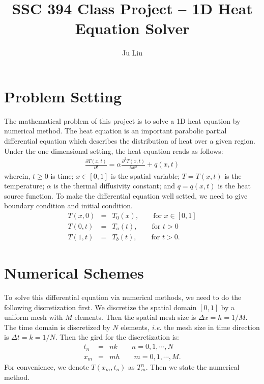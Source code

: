\documentclass[a4paper,12pt]{article}
\title{\textbf{SSC 394 Class Project -- 1D Heat Equation Solver}}
\author{Ju Liu}
\begin{document}
\maketitle
\section{Problem Setting}
The mathematical problem of this project is to solve a 1D heat equation by numerical method. The heat equation is an important parabolic partial differential equation which describes the distribution of heat over a given region. Under the one dimensional setting, the heat equation reads as follows:
\begin{eqnarray}
\frac{\partial T(x,t)}{\partial t} = \alpha \frac{\partial^{2}T(x,t)}{\partial x^{2}} + q(x,t)
\end{eqnarray}
wherein, \(t \geq 0\) is time; \(x \in [0, 1]\) is the spatial variable; \(T = T(x,t)\) is the temperature; \(\alpha\) is the thermal diffusivity constant; and \(q = q(x,t)\) is the heat source function. To make the differential equation well setted, we need to give boundary condition and initial condition.
\begin{eqnarray}
T(x,0) &=& T_{0}(x),  \qquad \mbox{for } x \in [0,1] \\
T(0,t) &=& T_{a}(t),  \qquad \mbox{for } t>0 \\
T(1,t) &=& T_{b}(t),  \qquad \mbox{for } t>0.
\end{eqnarray}


\section{Numerical Schemes}
To solve this differential equation via numerical methods, we need to do the following discretization first. We discretize the spatial domain \([0,1]\) by a uniform mesh with \(M\) elements. Then the spatial mesh size is \(\Delta x = h = 1/M\). The time domain is discretized by \(N\) elements, \textit{i.e.} the mesh size in time direction is \(\Delta t = k = 1/N\). Then the gird for the discretization is:
\begin{eqnarray}
t_{n} &=& nk \qquad n = 0,1, \cdots , N \\
x_{m} &=& mh \qquad m = 0,1, \cdots , M.
\end{eqnarray}
For convenience, we denote \(T(x_{m}, t_{n})\) as \(T_{m}^{n}\). Then we state the numerical method. \\
\end{document}
